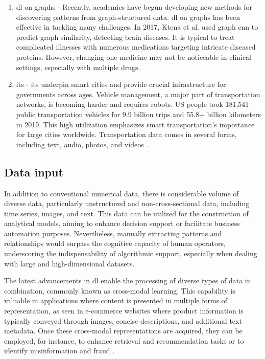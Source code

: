 \begin{enumerate}
\begin{itemize}
    \end{itemize}

    \item \acrshort{dl} on graphs - Recently, academics have begun developing new methods for discovering patterns from graph-structured data. \acrshort{dl} on graphs has been effective in tackling many challenges. 
    In 2017, Ktena et al. \cite{KTENA} used graph \acrshort{cnn} to predict graph similarity, detecting brain diseases. It is typical to treat complicated illnesses with numerous medications targeting intricate diseased proteins. However, changing one medicine may not be noticeable in clinical settings, especially with multiple drugs.

    \item \acrfull{its} - \acrshort{its} underpin smart cities and provide crucial infrastructure for governments across ages. Vehicle management, a major part of transportation networks, is becoming harder and requires robots. US people took 181,541 public transportation vehicles for 9.9 billion trips and 55.8+ billion kilometers in 2019. This high utilization emphasizes smart transportation's importance for large cities worldwide. Transportation data comes in several forms, including text, audio, photos, and videos \cite{DONG2021100379}.
    
\end{enumerate}

\subsection{Data input}
In addition to conventional numerical data, there is considerable volume of diverse data, particularly unstructured and non-cross-sectional data, including time series, images, and text. This data can be utilized for the construction of analytical models, aiming to enhance decision support or facilitate business automation purposes. Nevertheless, manually extracting patterns and relationships would surpass the cognitive capacity of human operators, underscoring the indispensability of algorithmic support, especially when dealing with large and high-dimensional datasets.

The latest advancements in \acrshort{dl} enable the processing of diverse types of data in combination, commonly known as cross-modal learning. This capability is valuable in applications where content is presented in multiple forms of representation, as seen in e-commerce websites where product information is typically conveyed through images, concise descriptions, and additional text metadata. Once these cross-modal representations are acquired, they can be employed, for instance, to enhance retrieval and recommendation tasks or to identify misinformation and fraud \cite{janiesch2021machine}.

